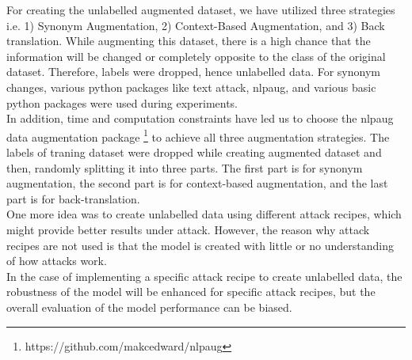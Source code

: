 \documentclass[%
	BCOR=8mm, %
	DIV=12,
	toc=bibliography, %
	toc=listof, %
	oneside, %
	egregdoesnotlikesansseriftitles, %
	]{scrbook}
\begin{document}
For creating the unlabelled augmented dataset, we have utilized three strategies i.e. 1) Synonym Augmentation, 2) Context-Based Augmentation, and 3) Back translation.
While augmenting this dataset, there is a high chance that the information will be changed or completely opposite to the class of the original dataset. Therefore, labels were dropped, hence unlabelled data. 
For synonym changes, various python packages like text attack, nlpaug, and various basic python packages were used during experiments.\\
In addition, time and computation constraints have led us to choose the nlpaug data augmentation package \footnote{https://github.com/makcedward/nlpaug} to achieve all three augmentation strategies. The labels of traning dataset were dropped while creating augmented dataset and then, randomly splitting it into three parts. The first part is for synonym augmentation, the second part is for context-based augmentation, and the last part is for back-translation.\\
One more idea was to create unlabelled data using different attack recipes, which might provide better results under attack. However, the reason why attack recipes are not used is that the model is created with little or no understanding of how attacks work. \\
In the case of implementing a specific attack recipe to create unlabelled data,  the robustness of the model will be enhanced for specific attack recipes, but the overall evaluation of the model performance can be biased.
\end{document}
